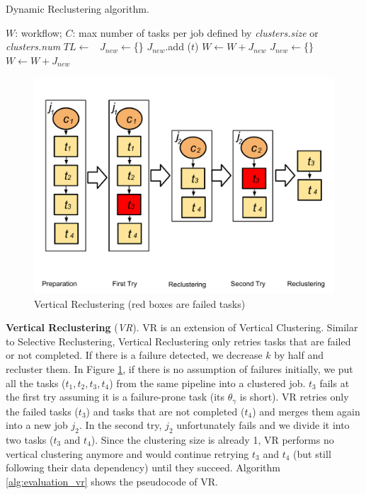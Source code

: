 \begin{algorithm}[!htb]
	\footnotesize
	\caption{Dynamic Reclustering algorithm.}
	\label{alg:evaluation_dr}
	\begin{algorithmic}[1]
		\Require $W$: workflow; $C$: max number of tasks per job defined by \emph{clusters.size} or \emph{clusters.num}
			\State $TL \gets$\ 
			\State $J_{new}\gets$\{\}
					\State $J_{new}$.add ($t$)
				\EndIf
					\State $W \gets W + J_{new}$
					\State $J_{new}\gets$\{\}
				\EndIf
			\EndFor
			\State $W \gets W + J_{new}$ 
		\EndProcedure
	\end{algorithmic}
\end{algorithm}

\begin{figure}[!htb]
\centering
  \includegraphics[width=0.65\linewidth]{figures/tolerance/vr.pdf}
  \caption{Vertical Reclustering (red boxes are failed tasks)}
  \label{fig:clustering_vr}
\end{figure}

\textbf{Vertical Reclustering} (\emph{VR}). VR is an extension of Vertical Clustering. Similar to Selective Reclustering, Vertical Reclustering only retries tasks that are failed or not completed.
If there is a failure detected, we decrease $k$ by half and recluster them. In Figure \ref{fig:clustering_vr}, if there is no assumption of failures initially, we put all the tasks ($t_1, t_2, t_3, t_4$) from the same  pipeline into a clustered job. $t_3$ fails at the first try assuming it is a failure-prone task (its $\theta_{\gamma}$ is short). VR retries only the failed tasks ($t_3$) and tasks that are not completed ($t_4$) and merges them again into a new job $j_2$. In the second try, $j_2$ unfortunately fails and we divide it into two tasks ($t_3$ and $t_4$). Since the clustering size is already 1, VR performs no vertical clustering anymore and would continue retrying $t_3$ and $t_4$ (but still following their data dependency) until they succeed. Algorithm \ref{alg:evaluation_vr} shows the pseudocode of VR. 

